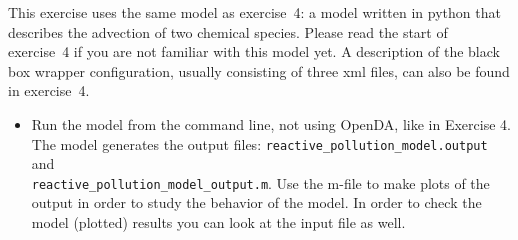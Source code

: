 
This exercise uses the same model as exercise~4: a model written in python that
describes the advection of two chemical species. Please read the start of
exercise~4 if you are not familiar with this model yet. A description of the
black box wrapper configuration, usually consisting of three xml files, can
also be found in exercise~4.

\begin{itemize}
\item Run the model from the command line, not using OpenDA, like in Exercise 4. The model
  generates the output files: {\tt reactive\_pollution\_model.output} and
  \\ {\tt reactive\_pollution\_model\_output.m}. Use the m-file to make plots
  of the output in order to study the behavior of the model. In order to check
  the model (plotted) results you can look at the input file as well.
\end{itemize}



